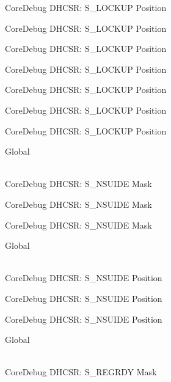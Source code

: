 \begin{DoxyRefList}
\label{deprecated__deprecated000113}%
%
Core\+Debug DHCSR\+: S\+\_\+\+LOCKUP Position 

\label{deprecated__deprecated000167}%
%
Core\+Debug DHCSR\+: S\+\_\+\+LOCKUP Position 

\label{deprecated__deprecated000252}%
%
Core\+Debug DHCSR\+: S\+\_\+\+LOCKUP Position 

\label{deprecated__deprecated000309}%
%
Core\+Debug DHCSR\+: S\+\_\+\+LOCKUP Position 

\label{deprecated__deprecated000385}%
%
Core\+Debug DHCSR\+: S\+\_\+\+LOCKUP Position 

\label{deprecated__deprecated000472}%
%
Core\+Debug DHCSR\+: S\+\_\+\+LOCKUP Position 

\label{deprecated__deprecated000574}%
%
Core\+Debug DHCSR\+: S\+\_\+\+LOCKUP Position  
\item[{\parbox[t]{\linewidth}{Global \doxylink{group___c_m_s_i_s___s_c_b_gabe0164afd9f6b8800fb7e05280e0ecda}{Core\+Debug\+\_\+\+DHCSR\+\_\+\+S\+\_\+\+NSUIDE\+\_\+\+Msk} }}]\hfill \\
\label{deprecated__deprecated000018}%
%
Core\+Debug DHCSR\+: S\+\_\+\+NSUIDE Mask 

\label{deprecated__deprecated000469}%
%
Core\+Debug DHCSR\+: S\+\_\+\+NSUIDE Mask 

\label{deprecated__deprecated000571}%
%
Core\+Debug DHCSR\+: S\+\_\+\+NSUIDE Mask  
\item[{\parbox[t]{\linewidth}{Global \doxylink{group___c_m_s_i_s___s_c_b_ga59e228c682eec72e892b2ce018afe477}{Core\+Debug\+\_\+\+DHCSR\+\_\+\+S\+\_\+\+NSUIDE\+\_\+\+Pos} }}]\hfill \\
\label{deprecated__deprecated000017}%
%
Core\+Debug DHCSR\+: S\+\_\+\+NSUIDE Position 

\label{deprecated__deprecated000468}%
%
Core\+Debug DHCSR\+: S\+\_\+\+NSUIDE Position 

\label{deprecated__deprecated000570}%
%
Core\+Debug DHCSR\+: S\+\_\+\+NSUIDE Position  
\item[{\parbox[t]{\linewidth}{Global \doxylink{group___c_m_s_i_s___core_debug_gac4cd6f3178de48f473d8903e8c847c07}{Core\+Debug\+\_\+\+DHCSR\+\_\+\+S\+\_\+\+REGRDY\+\_\+\+Msk} }}]\hfill \\
\label{deprecated__deprecated000028}%
%
Core\+Debug DHCSR\+: S\+\_\+\+REGRDY Mask 


\end{DoxyRefList}
